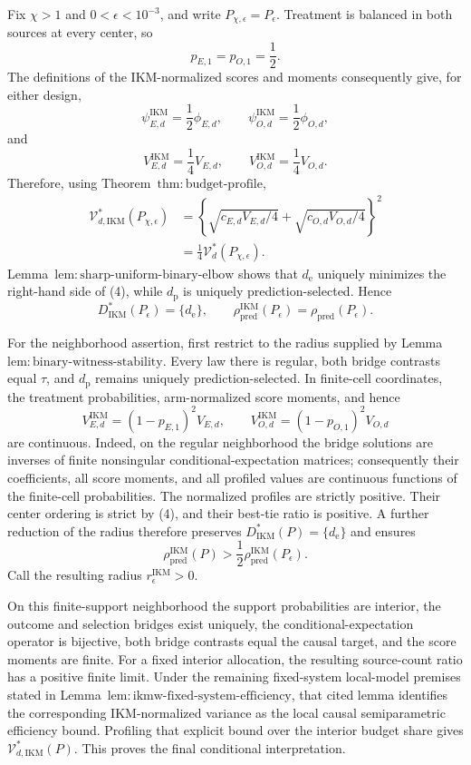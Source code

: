 Fix \(\chi>1\) and \(0<\epsilon<10^{-3}\), and write \(P_{\chi,\epsilon}=P_\epsilon\). Treatment is balanced in both sources at every center, so
\[
 p_{E,1}=p_{O,1}=\frac12.                              \tag{1}
\]
The definitions of the IKM-normalized scores and moments consequently give, for either design,
\[
 \psi_{E,d}^{\mathrm{IKM}}=\frac12\phi_{E,d},
 \qquad
 \psi_{O,d}^{\mathrm{IKM}}=\frac12\phi_{O,d},          \tag{2}
\]
and
\[
 V_{E,d}^{\mathrm{IKM}}=\frac14V_{E,d},
 \qquad
 V_{O,d}^{\mathrm{IKM}}=\frac14V_{O,d}.                \tag{3}
\]
Therefore, using Theorem~\(\mathrm{thm{:}budget\text{-}profile}\),
\[
\begin{aligned}
 \mathcal V_{d,\mathrm{IKM}}^*(P_{\chi,\epsilon})
 &=\left\{\sqrt{c_{E,d}V_{E,d}/4}
 +\sqrt{c_{O,d}V_{O,d}/4}\right\}^2\\
 &=\frac14\mathcal V_d^*(P_{\chi,\epsilon}).           \tag{4}
\end{aligned}
\]
Lemma~\(\mathrm{lem{:}sharp\text{-}uniform\text{-}binary\text{-}elbow}\) shows that \(d_{\mathrm e}\) uniquely minimizes the right-hand side of (4), while \(d_{\mathrm p}\) is uniquely prediction-selected. Hence
\[
 D_{\mathrm{IKM}}^*(P_\epsilon)=\{d_{\mathrm e}\},
 \qquad
 \rho_{\mathrm{pred}}^{\mathrm{IKM}}(P_\epsilon)
 =\rho_{\mathrm{pred}}(P_\epsilon).                   \tag{5}
\]

For the neighborhood assertion, first restrict to the radius supplied by Lemma~\(\mathrm{lem{:}binary\text{-}witness\text{-}stability}\). Every law there is regular, both bridge contrasts equal \(\tau\), and \(d_{\mathrm p}\) remains uniquely prediction-selected. In finite-cell coordinates, the treatment probabilities, arm-normalized score moments, and hence
\[
 V_{E,d}^{\mathrm{IKM}}=(1-p_{E,1})^2V_{E,d},
 \qquad
 V_{O,d}^{\mathrm{IKM}}=(1-p_{O,1})^2V_{O,d}           \tag{6}
\]
are continuous. Indeed, on the regular neighborhood the bridge solutions are inverses of finite nonsingular conditional-expectation matrices; consequently their coefficients, all score moments, and all profiled values are continuous functions of the finite-cell probabilities. The normalized profiles are strictly positive. Their center ordering is strict by (4), and their best-tie ratio is positive. A further reduction of the radius therefore preserves \(D_{\mathrm{IKM}}^*(P)=\{d_{\mathrm e}\}\) and ensures
\[
 \rho_{\mathrm{pred}}^{\mathrm{IKM}}(P)
 >\frac12\rho_{\mathrm{pred}}^{\mathrm{IKM}}(P_\epsilon).
\]
Call the resulting radius \(r_\epsilon^{\mathrm{IKM}}>0\).

On this finite-support neighborhood the support probabilities are interior, the outcome and selection bridges exist uniquely, the conditional-expectation operator is bijective, both bridge contrasts equal the causal target, and the score moments are finite. For a fixed interior allocation, the resulting source-count ratio has a positive finite limit. Under the remaining fixed-system local-model premises stated in Lemma~\(\mathrm{lem{:}ikmw\text{-}fixed\text{-}system\text{-}efficiency}\), that cited lemma identifies the corresponding IKM-normalized variance as the local causal semiparametric efficiency bound. Profiling that explicit bound over the interior budget share gives \(\mathcal V_{d,\mathrm{IKM}}^*(P)\). This proves the final conditional interpretation.